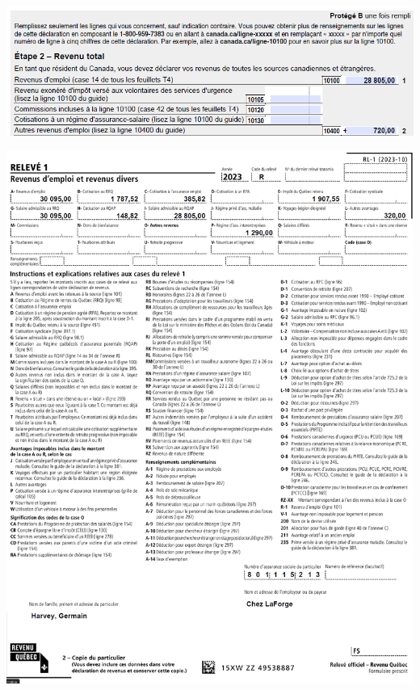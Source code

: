 \noindent
\includegraphics[width=\textwidth]{exercice/2-6/Q1/a-reponse.png}

\begin{sousQuestion}
	
	\begin{center}
		\includegraphics[width=.96\textwidth]{exercice/2-6/Q1/b-RL1.png}

\end{center}
\end{sousQuestion}
